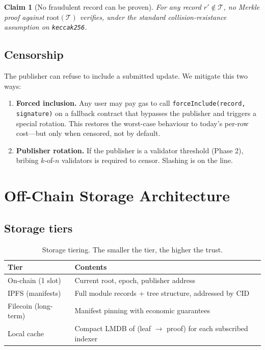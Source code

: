 \documentclass[11pt,a4paper]{article}
\newtheorem{claim}{Claim}[section]
\begin{document}
\begin{claim}[No fraudulent record can be proven]
\label{claim:no-fraud}
For any record $r' \notin \mathcal{T}$, no Merkle proof against $\mathrm{root}(\mathcal{T})$ verifies, under the standard collision-resistance assumption on \texttt{keccak256}.
\end{claim}

\subsection{Censorship}

The publisher can refuse to include a submitted update. We mitigate this two ways:

\begin{enumerate}
    \item \textbf{Forced inclusion.} Any user may pay gas to call \texttt{forceInclude(record, signature)} on a fallback contract that bypasses the publisher and triggers a special rotation. This restores the worst-case behaviour to today's per-row cost---but only when censored, not by default.
    \item \textbf{Publisher rotation.} If the publisher is a validator threshold (Phase 2), bribing $k$-of-$n$ validators is required to censor. Slashing is on the line.
\end{enumerate}

\section{Off-Chain Storage Architecture}

\subsection{Storage tiers}

\begin{table}[H]
\centering
\begin{tabularx}{\textwidth}{lX}
\toprule
\textbf{Tier} & \textbf{Contents} \\
\midrule
On-chain (1 slot) & Current root, epoch, publisher address \\
IPFS (manifests) & Full module records + tree structure, addressed by CID \\
Filecoin (long-term) & Manifest pinning with economic guarantees \\
Local cache & Compact LMDB of (leaf $\to$ proof) for each subscribed indexer \\
\bottomrule
\end{tabularx}
\caption{Storage tiering. The smaller the tier, the higher the trust.}
\end{table}
\end{document}
